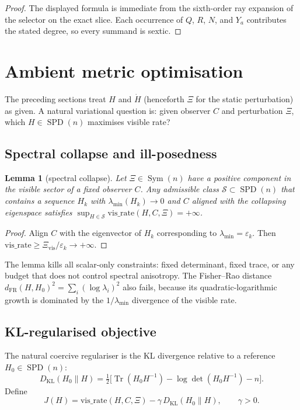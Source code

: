 \documentclass[11pt,a4paper]{article}
\numberwithin{equation}{section}
\DeclareMathOperator{\Tr}{Tr}
\DeclareMathOperator{\Sym}{Sym}
\theoremstyle{thmcompact}
\newtheorem{lemma}[theorem]{Lemma}
\theoremstyle{remark}
\begin{document}
\begin{proof}
The displayed formula is immediate from the sixth-order ray expansion of the selector on the exact slice. Each occurrence of $Q$, $R$, $N$, and $Y_a$ contributes the stated degree, so every summand is sextic.
\end{proof}

\section{Ambient metric optimisation}

The preceding sections treat $H$ and $\dot H$ (henceforth $\Xi$ for the static perturbation) as given.
A natural variational question is: given observer $C$ and perturbation $\Xi$, which $H\in\operatorname{SPD}(n)$ maximises visible rate?

\subsection*{Spectral collapse and ill-posedness}

\begin{lemma}[spectral collapse]\label{lem:spectral-collapse}
Let $\Xi\in\Sym(n)$ have a positive component in the visible sector of a fixed observer $C$.  Any admissible class $\mathcal S\subset\operatorname{SPD}(n)$ that contains a sequence $H_k$ with $\lambda_{\min}(H_k)\to 0$ and $C$ aligned with the collapsing eigenspace satisfies $\sup_{H\in\mathcal S}\mathrm{vis\_rate}(H,C,\Xi)=+\infty$.
\end{lemma}

\begin{proof}
Align $C$ with the eigenvector of $H_k$ corresponding to $\lambda_{\min}=\varepsilon_k$.  Then $\mathrm{vis\_rate}\ge \Xi_{\mathrm{vis}}/\varepsilon_k\to+\infty$.
\end{proof}

The lemma kills all scalar-only constraints: fixed determinant, fixed trace, or any budget that does not control spectral anisotropy.  The Fisher--Rao distance $d_{\mathrm{FR}}(H,H_0)^2=\sum_i(\log\lambda_i)^2$ also fails, because its quadratic-logarithmic growth is dominated by the $1/\lambda_{\min}$ divergence of the visible rate.

\subsection*{KL-regularised objective}

The natural coercive regulariser is the KL divergence relative to a reference $H_0\in\operatorname{SPD}(n)$:
\[
D_{\mathrm{KL}}(H_0\|H)
=\tfrac12\bigl[\Tr(H_0 H^{-1})-\log\det(H_0 H^{-1})-n\bigr].
\]
Define
\begin{equation}
J(H)=\mathrm{vis\_rate}(H,C,\Xi)-\gamma\,D_{\mathrm{KL}}(H_0\|H),
\qquad \gamma>0.
\label{eq:kl-objective}
\end{equation}
\end{document}
